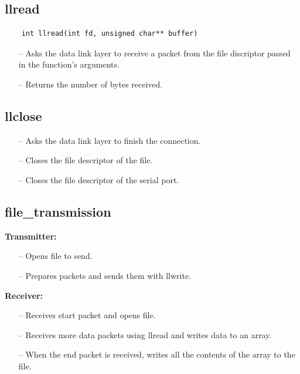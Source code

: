 \documentclass[11pt]{report}
\begin{document}
\subsection{llread}

\begin{verbatim}
    int llread(int fd, unsigned char** buffer)
\end{verbatim}
\begin{itemize}
    \item[--] Asks the data link layer to receive a packet from the file discriptor passed in the function's arguments.
    \item[--] Returns the number of bytes received.
\end{itemize}

\subsection{llclose}
\begin{itemize}
    \item[--] Asks the data link layer to finish the connection.
    \item[--] Closes the file descriptor of the file.
    \item[--] Closes the file descriptor of the serial port.
\end{itemize}

\subsection{file\_transmission}

\textbf{Transmitter:}
\begin{itemize} 
    \item[--] Opens file to send.
    \item[--] Prepares packets and sends them with llwrite.
\end{itemize}

\textbf{Receiver:}
\begin{itemize} 
    \item[--] Receives start packet and opens file.
    \item[--] Receives more data packets using llread and writes data to an array.
    \item[--] When the end packet is received, writes all the contents of the array to the file.
\end{itemize}

\newpage
\end{document}

